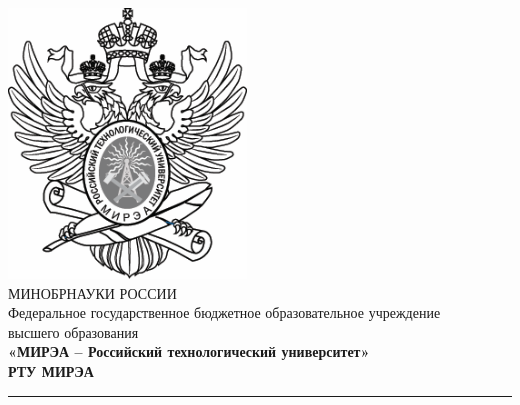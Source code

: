 
\begingroup
\fontsize{12}{12}\selectfont
\linespread{1}
\begin{center}
\includegraphics[scale=0.4]{./title/title.png}
\vspace{1em}\\
МИНОБРНАУКИ РОССИИ\\
Федеральное государственное бюджетное образовательное учреждение\\
высшего образования\\
\textbf{«МИРЭА -- Российский технологический университет»}\\
\vspace{1em}
\fontsize{14}{14}\selectfont
\textbf{РТУ МИРЭА}\\
\noindent\rule{16cm}{2pt}
\end{center}
\endgroup

\begin {center}
\end {center}

